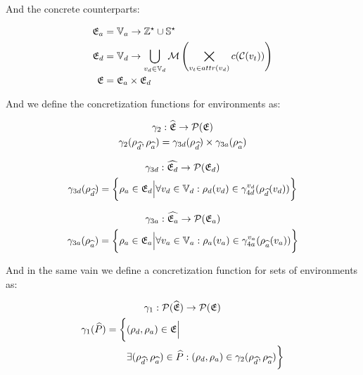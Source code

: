 And the concrete counterparts:


\begin{align}
    \mathfrak{E}_a &= \mathbb{V}_a \rightarrow \mathbb{Z}^\star \cup \mathbb{S}^\star \\
    \mathfrak{E}_d &= \mathbb{V}_d \rightarrow \bigcup_{v_d \in \mathbb{V}_d} \mathcal{M}\left(\bigtimes_{v_t \in attr(v_d)}c(\mathcal{C}(v_t))\right) \\
    \mathfrak{E} &= \mathfrak{E}_a \times \mathfrak{E}_d
\end{align}


And we define the concretization functions for environments as:


\begin{gather}
    \gamma_2 : \widehat{\mathfrak{E}} \rightarrow \mathcal{P}(\mathfrak{E})\\
    \gamma_2(\rho_{\widehat{d}}, \rho_{\widehat{a}}) = \gamma_{3d}(\rho_{\widehat{d}}) \times \gamma_{3a}(\rho_{\widehat{a}})
\end{gather}


\begin{gather}
    \gamma_{3d} : \widehat{\mathfrak{E}_d} \rightarrow \mathcal{P}(\mathfrak{E}_d)\\
    \gamma_{3d}(\rho_{\widehat{d}}) = \biggl\{ \rho_{a} \in \mathfrak{E}_d \Big| \forall v_d \in \mathbb{V}_d : \rho_d(v_d) \in \gamma^{v_d}_{4d}(\rho_{\widehat{d}}(v_d)) \biggr\}
\end{gather}


\begin{gather}
    \gamma_{3a} : \widehat{\mathfrak{E}_a} \rightarrow \mathcal{P}(\mathfrak{E}_a)\\
    \gamma_{3a}(\rho_{\widehat{a}}) = \biggl\{ \rho_{a} \in \mathfrak{E}_a \Big| \forall v_a \in \mathbb{V}_a : \rho_a(v_a) \in \gamma^{v_a}_{4a}(\rho_{\widehat{a}}(v_a)) \biggr\}
\end{gather}


And in the same vain we define a concretization function for sets of environments as:


\begin{gather}
    \gamma_1 : \mathcal{P}(\widehat{\mathfrak{E}}) \rightarrow \mathcal{P}(\mathfrak{E})\\
    \begin{split}
        \gamma_1(\widehat{P}) = \biggl\{ &(\rho_{d}, \rho_{a}) \in \mathfrak{E} \Big|\\
        &\exists (\rho_{\widehat{d}}, \rho_{\widehat{a}}) \in \widehat{P} : (\rho_{d}, \rho_{a}) \in \gamma_2(\rho_{\widehat{d}}, \rho_{\widehat{a}})\biggr\}
    \end{split}
\end{gather}


